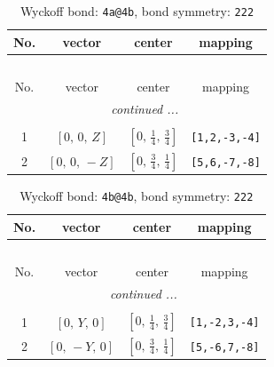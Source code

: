\documentclass[fleqn,8pt]{jsarticle}
\begin{document}
\begin{longtable}{cccc}
\caption{Wyckoff bond: {\tt 4a@4b}, bond symmetry: {\tt 222}}
 \\
 \hline \hline
No. & vector & center & mapping \\ \hline \endfirsthead

\multicolumn{3}{l}{\tablename\ \thetable{}} \\
 \hline \hline
No. & vector & center & mapping \\ \hline \endhead

 \hline \hline
\multicolumn{3}{r}{\footnotesize\it continued ...} \\ \endfoot

 \hline \hline
\multicolumn{3}{r}{} \\ \endlastfoot

1 & $\left[ 0,\, 0,\, Z \right]$ & $\left[ 0,\, \frac{1}{4},\, \frac{3}{4} \right]$ & {\tt [1,2,-3,-4]} \\ \hline
2 & $\left[ 0,\, 0,\, - Z \right]$ & $\left[ 0,\, \frac{3}{4},\, \frac{1}{4} \right]$ & {\tt [5,6,-7,-8]} \\
\end{longtable}
\renewcommand{\arraystretch}{1.2}
\begin{longtable}{cccc}
\caption{Wyckoff bond: {\tt 4b@4b}, bond symmetry: {\tt 222}}
 \\
 \hline \hline
No. & vector & center & mapping \\ \hline \endfirsthead

\multicolumn{3}{l}{\tablename\ \thetable{}} \\
 \hline \hline
No. & vector & center & mapping \\ \hline \endhead

 \hline \hline
\multicolumn{3}{r}{\footnotesize\it continued ...} \\ \endfoot

 \hline \hline
\multicolumn{3}{r}{} \\ \endlastfoot

1 & $\left[ 0,\, Y,\, 0 \right]$ & $\left[ 0,\, \frac{1}{4},\, \frac{3}{4} \right]$ & {\tt [1,-2,3,-4]} \\ \hline
2 & $\left[ 0,\, - Y,\, 0 \right]$ & $\left[ 0,\, \frac{3}{4},\, \frac{1}{4} \right]$ & {\tt [5,-6,7,-8]} \\
\end{longtable}
\renewcommand{\arraystretch}{1.2}
\end{document}
